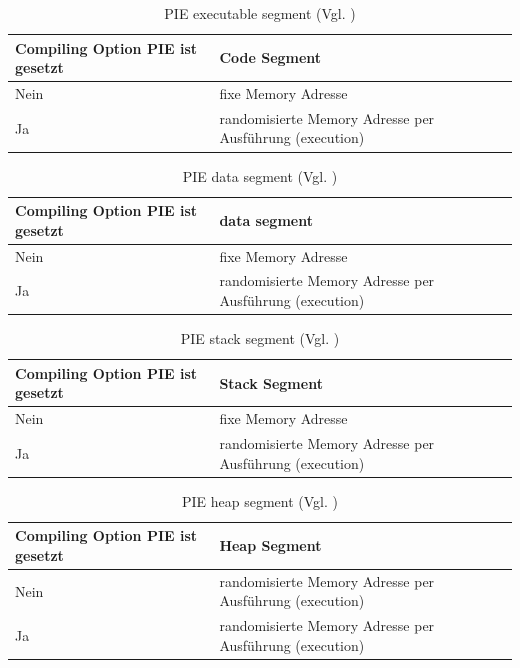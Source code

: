  \begin{table}
    \begin{center}
         \begin{tabular}{|p{6cm}|p{9cm}|} \hline
            Compiling Option PIE ist gesetzt & Code Segment \\ \hline
            Nein & fixe Memory Adresse\\ \hline
            Ja & randomisierte Memory Adresse per Ausführung (execution)\\ \hline
        \end{tabular}
        \caption{PIE executable segment (Vgl. \cite{iOSSec[5]}) }
       \label{tab:PIE executable segment}
    \end{center}
\end{table}

 \begin{table}
    \begin{center}
       \begin{tabular}{|p{6cm}|p{9cm}|} \hline
            Compiling Option PIE ist gesetzt & data segment\\ \hline
            Nein & fixe Memory Adresse\\ \hline
            Ja & randomisierte Memory Adresse per Ausführung (execution)\\ \hline
        \end{tabular}
        \caption{PIE data segment (Vgl. \cite{iOSSec[5]})}
       \label{tab:PIE data segment}
    \end{center}
\end{table}

\begin{table}
    \begin{center}
        \begin{tabular}{|p{6cm}|p{9cm}|} \hline
            Compiling Option PIE ist gesetzt & Stack Segment\\ \hline
            Nein & fixe Memory Adresse\\ \hline
             Ja & randomisierte Memory Adresse per Ausführung (execution)\\ \hline
        \end{tabular}
         \caption{PIE stack segment (Vgl. \cite{iOSSec[5]})}
       \label{tab:PIE stack segment}
    \end{center}
\end{table}    

\begin{table}
    \begin{center}
       \begin{tabular}{|p{6cm}|p{9cm}|} \hline
            Compiling Option PIE ist gesetzt & Heap Segment\\ \hline
            Nein & randomisierte Memory Adresse per Ausführung (execution)\\ \hline
            Ja & randomisierte Memory Adresse per Ausführung (execution)\\ \hline
        \end{tabular}
        \caption{PIE heap segment (Vgl. \cite{iOSSec[5]}) }
       \label{tab:PIE heap segment}
    \end{center}
\end{table}

